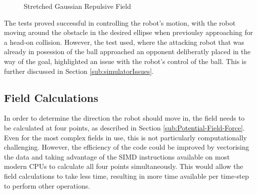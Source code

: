 \documentclass[10pt]{article}
\begin{document}
\begin{figure}
 \centering
 \caption{Stretched Gaussian Repulsive Field}
 \label{fig:stretchedGaussianField}
\end{figure}

The tests proved successful in controlling the robot's motion, with the robot
moving around the obstacle in the desired ellipse when previoulsy approaching
for a head-on collision.  However, the test used, where the attacking robot that
was already in posession of the ball approached an opponent deliberatly placed
in the way of the goal, highlighted an issue with the robot's control of the
ball.  This is further discussed in Section \ref{sub:simulatorIssues}.

\subsection{Field Calculations}

In order to determine the direction the robot should move in, the field needs to
be calculated at four points, as described in Section
\ref{sub:Potential-Field-Force}. Even for the most complex fields in use, this
is not particularly computationally challenging. However, the efficiency of the
code could be improved by vectorising the data and taking advantage of the
SIMD instructions available on most modern CPUs to calculate all four
points simultaneously. This would allow the field calculations to take less
time, resulting in more time available per time-step to perform other
operations.
\end{document}
